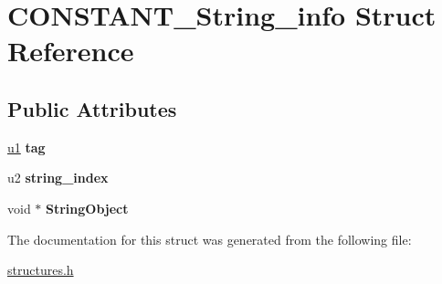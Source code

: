 \hypertarget{structCONSTANT__String__info}{}\section{C\+O\+N\+S\+T\+A\+N\+T\+\_\+\+String\+\_\+info Struct Reference}
\label{structCONSTANT__String__info}
\subsection*{Public Attributes}
\begin{DoxyCompactItemize}
\item 
\mbox{\label{structCONSTANT__String__info_a30a4fa4709b073577a3de5367b25e8f4}} 
\mbox{\hyperlink{structures_8h_ad9f4cdb6757615aae2fad89dab3c5470}{u1}} {\bfseries tag}
\item 
\mbox{\label{structCONSTANT__String__info_a3af668a8c82825626fbf4161636e4155}} 
u2 {\bfseries string\+\_\+index}
\item 
\mbox{\label{structCONSTANT__String__info_a99fec90399e5425646ca1d01d443d03f}} 
void $\ast$ {\bfseries String\+Object}
\end{DoxyCompactItemize}


The documentation for this struct was generated from the following file\+:\begin{DoxyCompactItemize}
\item 
\mbox{\hyperlink{structures_8h}{structures.\+h}}\end{DoxyCompactItemize}
